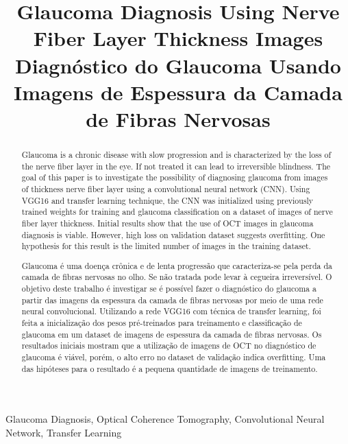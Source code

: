 \documentclass[conference]{IEEEtran}
\begin{document}
\title{Glaucoma Diagnosis Using Nerve Fiber Layer Thickness Images \\ Diagnóstico do Glaucoma Usando Imagens de Espessura da Camada de Fibras Nervosas}


\author{
}


\maketitle

\thispagestyle{fancy}


\renewcommand{\abstractname}{Abstract}
\begin{abstract}
Glaucoma is a chronic disease with slow progression and is characterized by the loss of the nerve fiber layer in the eye. If not treated it can lead to irreversible blindness. The goal of this paper is to investigate the possibility of diagnosing glaucoma from images of thickness nerve fiber layer using a convolutional neural network (CNN). Using VGG16 and transfer learning  technique, the CNN was initialized using previously trained weights for training and glaucoma classification on a dataset of images of nerve fiber layer thickness. Initial results show that the use of OCT images in glaucoma diagnosis is viable. However, high loss on validation dataset suggests overfitting. One hypothesis for this result is the limited number of images in the training dataset.
\end{abstract}

\renewcommand\IEEEkeywordsname{Keywords}
\begin{IEEEkeywords}
\label{Keywords}
Glaucoma Diagnosis, Optical Coherence Tomography, Convolutional Neural Network, Transfer Learning
\end{IEEEkeywords}

\renewcommand{\abstractname}{Resumo}
\begin{abstract}
\label{Resumo}
Glaucoma é uma doença crônica e de lenta progressão que caracteriza-se pela perda da camada de fibras nervosas no olho. Se não tratada pode levar à cegueira irreversível. O objetivo deste trabalho é investigar se é possível fazer o diagnóstico do glaucoma a partir das imagens da espessura da camada de fibras nervosas por meio de uma rede neural convolucional. Utilizando a rede VGG16 com técnica de transfer learning, foi feita a inicialização dos pesos pré-treinados para treinamento e classificação de glaucoma em um dataset de imagens de espessura da camada de fibras nervosas. Os resultados iniciais mostram que a utilização de imagens de OCT no diagnóstico de glaucoma é viável, porém, o alto erro no dataset de validação indica overfitting. Uma das hipóteses para o resultado é a pequena quantidade de imagens de treinamento.

\end{abstract}
\end{document}
